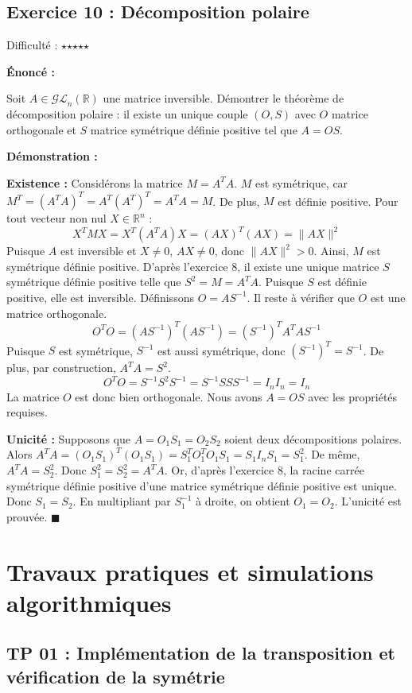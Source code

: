 \documentclass[11pt,a4paper]{article}
\begin{document}
\subsection*{Exercice 10 : Décomposition polaire}

Difficulté : $\star$$\star$$\star$$\star$$\star$

\textbf{Énoncé :}


Soit $A \in \mathcal{GL}_n(\mathbb{R})$ une matrice inversible. Démontrer le théorème de décomposition polaire : il existe un unique couple $(O, S)$ avec $O$ matrice orthogonale et $S$ matrice symétrique définie positive tel que $A = O S$.

\textbf{Démonstration :}


\textbf{Existence :}
Considérons la matrice $M = A^T A$. $M$ est symétrique, car $M^T = (A^T A)^T = A^T (A^T)^T = A^T A = M$.
De plus, $M$ est définie positive. Pour tout vecteur non nul $X \in \mathbb{R}^n$ :
$$ X^T M X = X^T (A^T A) X = (AX)^T (AX) = \|AX\|^2 $$
Puisque $A$ est inversible et $X \neq 0$, $AX \neq 0$, donc $\|AX\|^2 > 0$. Ainsi, $M$ est symétrique définie positive.
D'après l'exercice 8, il existe une unique matrice $S$ symétrique définie positive telle que $S^2 = M = A^T A$.
Puisque $S$ est définie positive, elle est inversible. Définissons $O = A S^{-1}$.
Il reste à vérifier que $O$ est une matrice orthogonale.
$$ O^T O = (A S^{-1})^T (A S^{-1}) = (S^{-1})^T A^T A S^{-1} $$
Puisque $S$ est symétrique, $S^{-1}$ est aussi symétrique, donc $(S^{-1})^T = S^{-1}$.
De plus, par construction, $A^T A = S^2$.
$$ O^T O = S^{-1} S^2 S^{-1} = S^{-1} S S S^{-1} = I_n I_n = I_n $$
La matrice $O$ est donc bien orthogonale. Nous avons $A = O S$ avec les propriétés requises.

\textbf{Unicité :}
Supposons que $A = O_1 S_1 = O_2 S_2$ soient deux décompositions polaires.
Alors $A^T A = (O_1 S_1)^T (O_1 S_1) = S_1^T O_1^T O_1 S_1 = S_1 I_n S_1 = S_1^2$.
De même, $A^T A = S_2^2$.
Donc $S_1^2 = S_2^2 = A^T A$.
Or, d'après l'exercice 8, la racine carrée symétrique définie positive d'une matrice symétrique définie positive est unique.
Donc $S_1 = S_2$.
En multipliant par $S_1^{-1}$ à droite, on obtient $O_1 = O_2$.
L'unicité est prouvée. $\blacksquare$

\section{Travaux pratiques et simulations algorithmiques}
\subsection*{TP 01 : Implémentation de la transposition et vérification de la symétrie}
\end{document}
